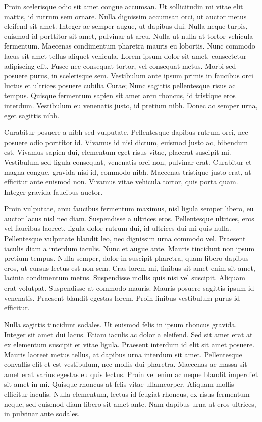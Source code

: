 \documentclass{article}
\begin{document}
Proin scelerisque odio sit amet congue accumsan. Ut sollicitudin mi vitae elit mattis, id rutrum sem ornare. Nulla dignissim accumsan orci, ut auctor metus eleifend sit amet. Integer ac semper augue, ut dapibus dui. Nulla neque turpis, euismod id porttitor sit amet, pulvinar at arcu. Nulla ut nulla at tortor vehicula fermentum. Maecenas condimentum pharetra mauris eu lobortis. Nunc commodo lacus sit amet tellus aliquet vehicula. Lorem ipsum dolor sit amet, consectetur adipiscing elit. Fusce nec consequat tortor, vel consequat metus. Morbi sed posuere purus, in scelerisque sem. Vestibulum ante ipsum primis in faucibus orci luctus et ultrices posuere cubilia Curae; Nunc sagittis pellentesque risus ac tempus. Quisque fermentum sapien sit amet arcu rhoncus, id tristique eros interdum. Vestibulum eu venenatis justo, id pretium nibh. Donec ac semper urna, eget sagittis nibh.

Curabitur posuere a nibh sed vulputate. Pellentesque dapibus rutrum orci, nec posuere odio porttitor id. Vivamus id nisi dictum, euismod justo ac, bibendum est. Vivamus sapien dui, elementum eget risus vitae, placerat suscipit mi. Vestibulum sed ligula consequat, venenatis orci non, pulvinar erat. Curabitur et magna congue, gravida nisi id, commodo nibh. Maecenas tristique justo erat, at efficitur ante euismod non. Vivamus vitae vehicula tortor, quis porta quam. Integer gravida faucibus auctor.

Proin vulputate, arcu faucibus fermentum maximus, nisl ligula semper libero, eu auctor lacus nisl nec diam. Suspendisse a ultrices eros. Pellentesque ultrices, eros vel faucibus laoreet, ligula dolor rutrum dui, id ultrices dui mi quis nulla. Pellentesque vulputate blandit leo, nec dignissim urna commodo vel. Praesent iaculis diam a interdum iaculis. Nunc et augue ante. Mauris tincidunt non ipsum pretium tempus. Nulla semper, dolor in suscipit pharetra, quam libero dapibus eros, ut cursus lectus est non sem. Cras lorem mi, finibus sit amet enim sit amet, lacinia condimentum metus. Suspendisse mollis quis nisi vel suscipit. Aliquam erat volutpat. Suspendisse at commodo mauris. Mauris posuere sagittis ipsum id venenatis. Praesent blandit egestas lorem. Proin finibus vestibulum purus id efficitur.

Nulla sagittis tincidunt sodales. Ut euismod felis in ipsum rhoncus gravida. Integer sit amet dui lacus. Etiam iaculis ac dolor a eleifend. Sed sit amet erat at ex elementum suscipit et vitae ligula. Praesent interdum id elit sit amet posuere. Mauris laoreet metus tellus, at dapibus urna interdum sit amet. Pellentesque convallis elit et est vestibulum, nec mollis dui pharetra. Maecenas ac massa sit amet erat varius egestas eu quis lectus. Proin vel enim ac neque blandit imperdiet sit amet in mi. Quisque rhoncus at felis vitae ullamcorper. Aliquam mollis efficitur iaculis. Nulla elementum, lectus id feugiat rhoncus, ex risus fermentum neque, sed euismod diam libero sit amet ante. Nam dapibus urna at eros ultrices, in pulvinar ante sodales.
\end{document}
